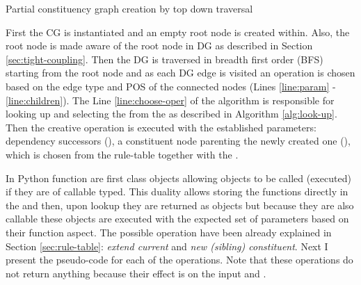 \begin{algorithm}[!ht]
	\caption{Partial constituency graph creation by top down traversal}
	\label{alg:phase-one}
\end{algorithm}

First the CG is instantiated and an empty root node is created within. Also, the root node is made aware of the root node in DG as described in Section \ref{sec:tight-coupling}. Then the DG is traversed in breadth first order (BFS) starting from the root node and as each DG edge is visited an operation is chosen based on the edge type and POS of the connected nodes (Lines \ref{line:param} - \ref{line:children}). The Line \ref{line:choose-oper} of the algorithm is responsible for looking up and selecting the \operation from the \rt as described in Algorithm \ref{alg:look-up}.
Then the creative operation is executed with the established parameters: dependency successors (\Children), a constituent node parenting the newly created one (\cgPointer), \elementType which is chosen from the rule-table together with the \operation. %
 
In Python function are first class objects allowing objects to be called (executed) if they are of callable typed. This duality allows storing the functions directly in the \rt and then, upon lookup they are returned as objects but because they are also callable these objects are executed with the expected set of parameters based on their function aspect. The possible operation have been already explained in Section \ref{sec:rule-table}: \textit{extend current} and \textit{new (sibling) constituent}. Next I present the pseudo-code for each of the operations. Note that these operations do not return anything because their effect is on the input \cg and \dg. 

